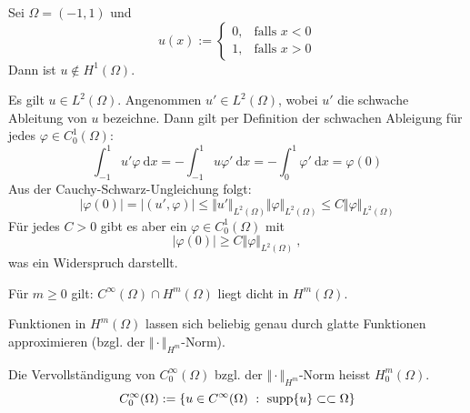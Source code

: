 \begin{bsp}
    Sei $\Omega = (-1, 1)$ und 
    \[
        u(x) := \begin{cases}
            0, & \text{falls } x < 0 \\
            1, & \text{falls } x > 0
        \end{cases}
    \]
    Dann ist $u \notin H^1(\Omega)$.

    Es gilt $u \in L^2(\Omega)$. Angenommen $u' \in L^2(\Omega)$, wobei $u'$ die schwache Ableitung von $u$ bezeichne.
    Dann gilt per Definition der schwachen Ableigung für jedes $\varphi \in C_0^1(\Omega)$:
    \[
        \int_{-1}^1 u' \varphi \ \mathrm  dx = - \int_{-1}^1 u \varphi' \ \mathrm dx = - \int_0^1 \varphi' \ \mathrm dx = \varphi(0)
    \]
    Aus der Cauchy-Schwarz-Ungleichung folgt:
    \[
        |\varphi(0)| = | (u', \varphi) | \leq \Vert u' \Vert_{L^2(\Omega)}  \Vert \varphi \Vert_{L^2(\Omega)} 
            \leq C \Vert \varphi \Vert_{L^2(\Omega)}
    \]
    Für jedes $C > 0$ gibt es aber ein $\varphi \in C_0^1(\Omega)$ mit
    \[
        | \varphi(0) | \geq C \Vert \varphi \Vert_{L^2(\Omega)} \ ,
    \]
    was ein Widerspruch darstellt.
\end{bsp}

\begin{satz}
    Für $m \geq 0$ gilt:
    $C^\infty(\Omega) \cap H^m(\Omega)$ liegt dicht in $H^m(\Omega)$.
\end{satz}

\begin{bem}
    Funktionen in $H^m(\Omega)$ lassen sich beliebig genau durch glatte Funktionen approximieren (bzgl. der 
    $\Vert \cdot \Vert_{H^m}$-Norm).
\end{bem}

\begin{defi}
    Die Vervollständigung von $C_0^\infty(\Omega)$ bzgl. der $\Vert \cdot \Vert_{H^m}$-Norm heisst
    $H_0^m(\Omega)$.
    \[
        C_0^\infty(\Omega) := \{ u \in C^\infty(\Omega) \ : \ \operatorname{supp}\{u\} \subset \subset \Omega \}
    \]
\end{defi}

